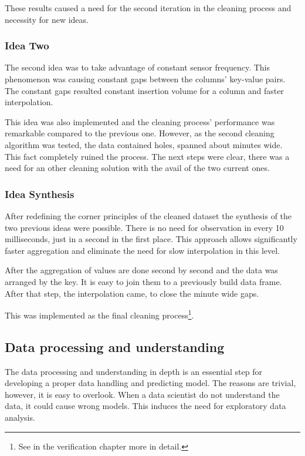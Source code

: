 		These results caused a need for the second iteration in the cleaning process and necessity for new ideas.
		\subsubsection{Idea Two}
		The second idea was to take advantage of constant sensor frequency. This phenomenon was causing constant gaps between the columns' key-value pairs. The constant gaps resulted constant insertion volume for a column and faster interpolation.

		This idea was also implemented and the cleaning process' performance was remarkable compared to the previous one. However, as the second cleaning algorithm was tested, the data contained holes, spanned about minutes wide. This fact completely ruined the process. The next steps were clear, there was a need for an other cleaning solution with the avail of the two current ones.
\clearpage\subsubsection{Idea Synthesis}
		After redefining the corner principles of the cleaned dataset the synthesis of the two previous ideas were possible.
		There is no need for observation in every 10 milliseconds, just in a second in the first place. This approach allows significantly faster aggregation and eliminate the need for slow interpolation in this level.

		After the aggregation of values are done second by second and the data was arranged by the key. It is easy to join them to a previously build data frame. After that step, the interpolation came, to close the minute wide gaps.

		This was implemented as the final cleaning process\footnote{See in the verification chapter more in detail.}.
\subsection{Data processing and understanding}
		The data processing and understanding in depth is an essential step for developing a proper data handling and predicting model.
		The reasons are trivial, however, it is easy to overlook. When a data scientist do not understand the data, it could cause wrong models. This induces the need for exploratory data analysis.
